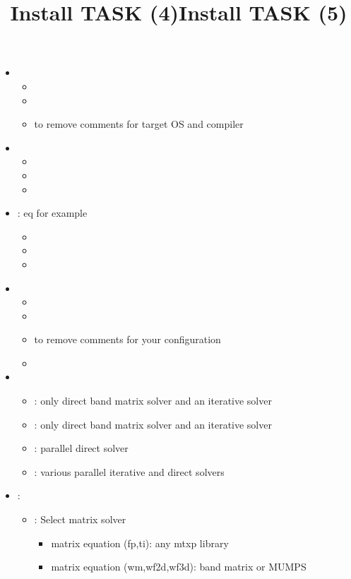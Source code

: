 \documentclass[12pt]{article}
\begin{document}
\title{Install TASK (4)}
\begin{itemize}
\item
{}
\begin{itemize}
\item
{}
\item
{}
\item
{} to remove comments for target OS and compiler
\end{itemize}
\item
{}
\begin{itemize}
\item
{}
\item
{}
\item
{}
\end{itemize}
\item
{}: eq for example
\begin{itemize}
\item
{}
\item
{}
\item
{}
\end{itemize}
\end{itemize}

\title{Install TASK (5)}
\begin{itemize}
\item
{}
\begin{itemize}
\item
{}
\item
{}
\item
{} to remove comments for your configuration
\item
{}
\end{itemize}
\item
{}
\begin{itemize}
\item
{}: only direct band matrix solver and an iterative solver
\item
{}: only direct band matrix solver and an iterative solver
\item
{}: parallel direct solver
\item
{}: various parallel iterative and direct solvers
\end{itemize}
\item
{}:
\begin{itemize}
\item
{}: Select matrix solver
\begin{itemize}
\item
{} matrix equation (fp,ti): any mtxp library
\item
{} matrix equation (wm,wf2d,wf3d): band matrix or MUMPS
\end{itemize}
\end{itemize}
\end{itemize}
\end{document}
